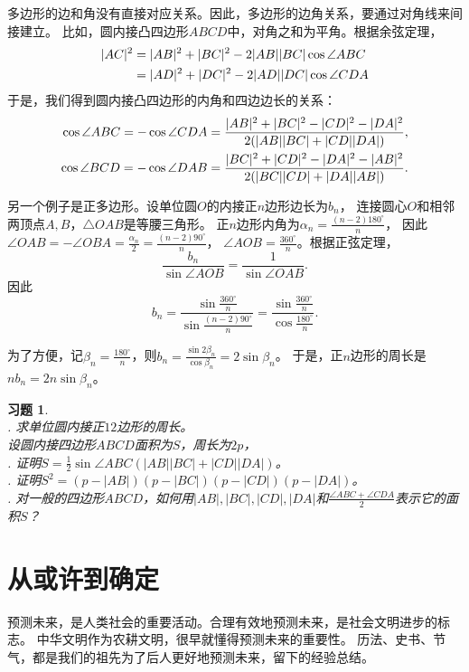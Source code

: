 \documentclass[12pt,UTF8]{ctexbook}
\newtheorem{xt}{习题}[section]
\begin{document}
多边形的边和角没有直接对应关系。因此，多边形的边角关系，要通过对角线来间接建立。
比如，圆内接凸四边形$ABCD$中，对角之和为平角。根据余弦定理，
\begin{align}
    |AC|^2 &= |AB|^2 + |BC|^2 -2|AB||BC|\cos\angle ABC \notag \\
    &= |AD|^2 + |DC|^2 -2|AD||DC|\cos\angle CDA \notag
\end{align}
于是，我们得到圆内接凸四边形的内角和四边边长的关系：
\begin{align}
    \cos\angle ABC = -\cos \angle CDA &= \frac{|AB|^2 + |BC|^2 - |CD|^2 - |DA|^2 }{2(|AB||BC| + |CD||DA|)}, \notag \\
    \cos\angle BCD = -\cos \angle DAB &= \frac{|BC|^2 + |CD|^2 - |DA|^2 - |AB|^2 }{2(|BC||CD| + |DA||AB|)}. \notag 
\end{align}

另一个例子是正多边形。设单位圆$O$的内接正$n$边形边长为$b_n$，
连接圆心$O$和相邻两顶点$A,B$，$\triangle OAB$是等腰三角形。
正$n$边形内角为$\alpha_n = \frac{(n-2)180^\circ}{n}$，
因此$\angle OAB = -\angle OBA = \frac{\alpha_n}{2} = \frac{(n-2)90^\circ}{n}$，
$\angle AOB = \frac{360^\circ}{n}$。根据正弦定理，
$$ \frac{b_n}{\sin \angle AOB} = \frac{1}{\sin \angle OAB}.$$
因此
$$b_n = \frac{\sin \frac{360^\circ}{n}}{\sin \frac{(n-2)90^\circ}{n}} = \frac{\sin \frac{360^\circ}{n}}{\cos \frac{180^\circ}{n}}.$$

为了方便，记$\beta_n = \frac{180^\circ}{n}$，则$b_n = \frac{\sin 2\beta_n}{\cos \beta_n} = 2\sin \beta_n$。
于是，正$n$边形的周长是$nb_n = 2n\sin \beta_n$。

\begin{xt}\label{xt:2-6-10}
    \mbox{} \\
    . 求单位圆内接正$12$边形的周长。\\
    设圆内接四边形$ABCD$面积为$S$，周长为$2p$，\\
    . 证明$S = \frac12 \sin \angle ABC (|AB||BC| + |CD||DA|)$。 \\
    . 证明$S^2 = (p - |AB|)(p - |BC|)(p - |CD|)(p - |DA|)$。\\
    . 对一般的四边形$ABCD$，如何用$|AB|, |BC|, |CD|, |DA|$和$\frac{\angle ABC + \angle CDA}{2}$表示它的面积$S$？
\end{xt}

\chapter{从或许到确定}
预测未来，是人类社会的重要活动。合理有效地预测未来，是社会文明进步的标志。
中华文明作为农耕文明，很早就懂得预测未来的重要性。
历法、史书、节气，都是我们的祖先为了后人更好地预测未来，留下的经验总结。
\end{document}
